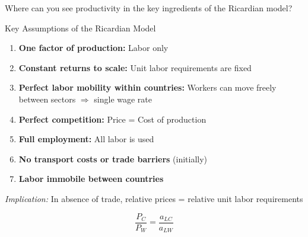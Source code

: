 \documentclass{beamer}
\begin{document}

\begin{frame}{Where can you see productivity in the key ingredients of the Ricardian model?}

\end{frame}


\begin{frame}{Key Assumptions of the Ricardian Model}

\begin{enumerate}
    \item \textbf{One factor of production:} Labor only
    
    \vspace{0.2cm}
    
    \item \textbf{Constant returns to scale:} Unit labor requirements are fixed
    
    \vspace{0.2cm}
    
    \item \textbf{Perfect labor mobility within countries:} Workers can move freely between sectors $\Rightarrow$ single wage rate
    
    \vspace{0.2cm}
    
    \item \textbf{Perfect competition:} Price = Cost of production
    
    \vspace{0.2cm}
    
    \item \textbf{Full employment:} All labor is used
    
    \vspace{0.2cm}
    
    \item \textbf{No transport costs or trade barriers} (initially)
    
    \vspace{0.2cm}
    
    \item \textbf{Labor immobile between countries}
\end{enumerate}

\vspace{0.3cm}

\textit{Implication:} In absence of trade, relative prices = relative unit labor requirements

$$\frac{P_C}{P_W} = \frac{a_{LC}}{a_{LW}}$$

\end{frame}
\end{document}
